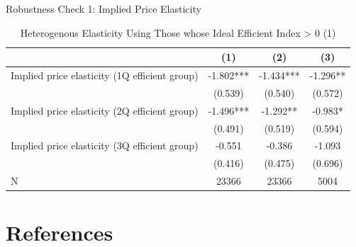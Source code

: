 \documentclass[
  ignorenonframetext,
]{beamer}
\begin{document}
\begin{frame}{Robustness Check 1: Implied Price Elasticity}
\protect\hypertarget{robustness-check-1-implied-price-elasticity}{}
\begin{table}

\caption{\label{tab:kableSubsetHeteroElasticitySlide2}Heterogenous Elasticity Using Those whose Ideal Efficient Index > 0 (1)}
\centering
\fontsize{8}{10}\selectfont
\begin{tabular}[t]{lccc}
\toprule
 & (1) & (2) & (3)\\
\midrule
Implied price elasticity (1Q efficient group) & -1.802*** & -1.434*** & -1.296**\\
 & (0.539) & (0.540) & (0.572)\\
Implied price elasticity (2Q efficient group) & -1.496*** & -1.292** & -0.983*\\
 & (0.491) & (0.519) & (0.594)\\
Implied price elasticity (3Q efficient group) & -0.551 & -0.386 & -1.093\\
 & (0.416) & (0.475) & (0.696)\\
N & 23366 & 23366 & 5004\\
\bottomrule
\end{tabular}
\end{table}

\clearpage
\end{frame}

\hypertarget{references}{%
\section*{References}\label{references}}
\end{document}
